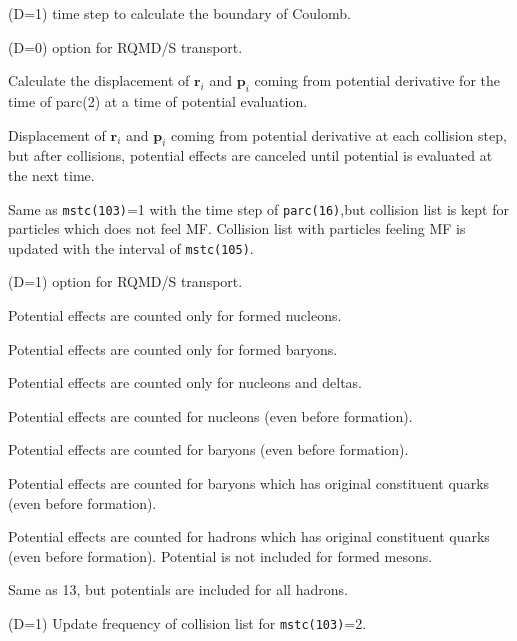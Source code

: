 \documentclass[]{article}
\newenvironment{entry}%
{\begin{list}{}{\setlength{\topsep}{0mm} \setlength{\itemsep}{0mm}
\setlength{\parskip}{0mm} \setlength{\parsep}{0mm}
\setlength{\leftmargin}{20mm} \setlength{\rightmargin}{0mm}
\setlength{\labelwidth}{18mm} \setlength{\labelsep}{2mm}}}%
{\end{list}}
\newenvironment{subentry}%
{\begin{list}{}{\setlength{\topsep}{0mm} \setlength{\itemsep}{0mm}
\setlength{\parskip}{0mm} \setlength{\parsep}{0mm}
\setlength{\leftmargin}{10mm} \setlength{\rightmargin}{0mm}
\setlength{\labelwidth}{18mm} \setlength{\labelsep}{2mm}}}%
{\end{list}}
\newcommand{\itemt}[1]{\item[{\tt #1}\hfill]}
\begin{document}
\begin{entry}
\itemt{mstc(102) :}(D=1) time step to calculate the boundary of Coulomb.
%
%
\itemt{mstc(103) :}(D=0) option for RQMD/S transport.
 \begin{subentry}
   \itemt{$=0$ :} Calculate the displacement of $\bm{r}_i$ and $\bm{p}_i$
 	coming from potential derivative
	for the time of parc(2)
         at a time of potential evaluation.
   \itemt{$=1$ :} Displacement of $\bm{r}_i$ and $\bm{p}_i$
         coming from potential derivative at each collision step,
         but after collisions, potential effects are canceled
	 until potential is evaluated at the next time.
   \itemt{$=2$ :} Same as {\tt mstc(103)}=1 with the time step of
       {\tt parc(16)},but collision list is kept for particles which
        does not feel MF.
	Collision list with particles feeling MF is updated
       with the interval of {\tt mstc(105)}.
 \end{subentry}
\itemt{mstc(104) :}(D=1) option for RQMD/S transport.
 \begin{subentry}
   \itemt{$=0$ :} Potential effects are counted only for formed nucleons.
   \itemt{$=1$ :} Potential effects are counted only for formed baryons.
   \itemt{$=2$ :} Potential effects are counted only for nucleons and deltas.
   \itemt{$=10$ :} Potential effects are counted for nucleons
         (even before formation).
   \itemt{$=11$ :} Potential effects are counted for baryons
          (even before formation).
   \itemt{$=12$ :} Potential effects are counted for baryons
           which has original constituent quarks
          (even before formation).
   \itemt{$=13$:} Potential effects are counted for hadrons
           which has original constituent quarks
          (even before formation). 
             Potential is not included for formed mesons.
   \itemt{$=14$:} Same as 13, but potentials are included for all hadrons.

 \end{subentry}
\itemt{mstc(105) :}(D=1) Update frequency of collision list
             for {\tt mstc(103)}=2.


\end{entry}
\end{document}

